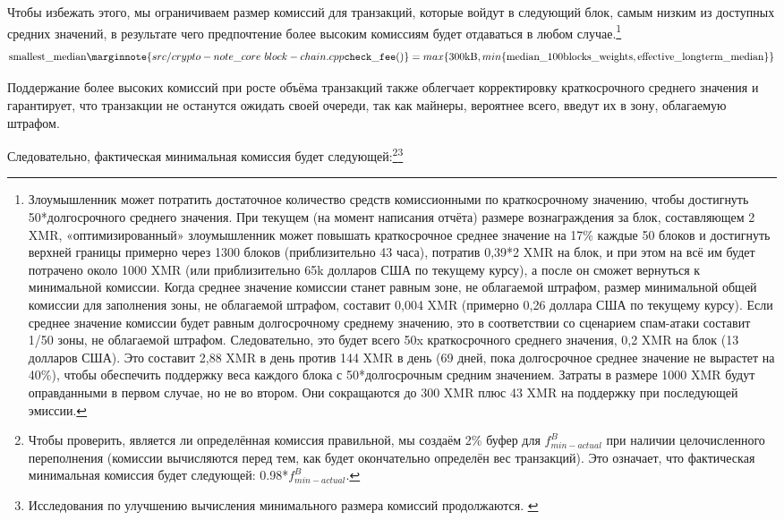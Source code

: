 Чтобы избежать этого, мы ограничиваем размер комиссий для транзакций, которые войдут в следующий блок, самым низким из доступных средних значений, в результате чего предпо\-чтение более высоким комиссиям будет отдаваться в любом случае.\footnote{Злоумышленник может потратить достаточное количество средств комиссионными по краткосрочному значению, чтобы достигнуть 50*долгосрочного среднего значения. При текущем (на момент написания отчёта) размере вознаграждения за блок, составляющем 2 XMR, «оптимизированный» злоумышленник может повышать краткосрочное среднее значение на 17\% каждые 50 блоков и достигнуть верхней границы примерно через 1300 блоков (приблизительно 43 часа), потратив 0,39*2 XMR на блок, и при этом на всё им будет потрачено около 1000 XMR (или приблизительно 65k долларов США по текущему курсу), а после он сможет вернуться к минимальной комиссии. Когда среднее значение комиссии станет равным зоне, не облагаемой штрафом, размер минимальной общей комиссии для заполнения зоны, не облагаемой штрафом, составит 0,004 XMR (примерно 0,26 доллара США по текущему курсу). Если среднее значение комиссии будет равным долгосрочному среднему значению, это в соответствии со сценарием спам-атаки составит 1/50 зоны, не облагаемой штрафом. Следовательно, это будет всего 50x краткосрочного среднего значения, 0,2 XMR на блок (13 долларов США). Это составит 2,88 XMR в день против 144 XMR в день (69 дней, пока долгосрочное среднее значение не вырастет на 40\%), чтобы обеспечить поддержку веса каждого блока с 50*долгосрочным средним значением. Затраты в размере 1000 XMR будут оправданными в первом случае, но не во втором. Они сокращаются до 300 XMR плюс 43 XMR на поддержку при последующей эмиссии.}\vspace{.1cm}
\[\textrm{smallest\_median}\marginnote{src/crypto- note\_core\ block- chain.cpp {\tt check\_fee()}} = max\{\textrm{300kB}, min\{\textrm{median\_100blocks\_weights}, \textrm{effective\_longterm\_median}\}\}\]

Поддержание более высоких комиссий при росте объёма транзакций также облегчает коррек\-тировку краткосрочного среднего значения и гарантирует, что транзакции не останутся ожи\-дать своей очереди, так как майнеры, вероятнее всего, введут их в зону, облагаемую штрафом.

Следовательно, фактическая минимальная комиссия будет следующей:\footnote{Чтобы проверить, является ли определённая комиссия правильной, мы создаём 2\% буфер для $f^{B}_{min-actual}$ при наличии целочисленного переполнения (комиссии вычисляются перед тем, как будет окончательно определён вес транзакций). Это означает, что фактическая минимальная комиссия будет следующей: 0.98*$f^{B}_{min-actual}$.}\footnote{Исследования по улучшению вычисления минимального размера комиссий продолжаются. \cite{min-fee-research-issue-70}}%

